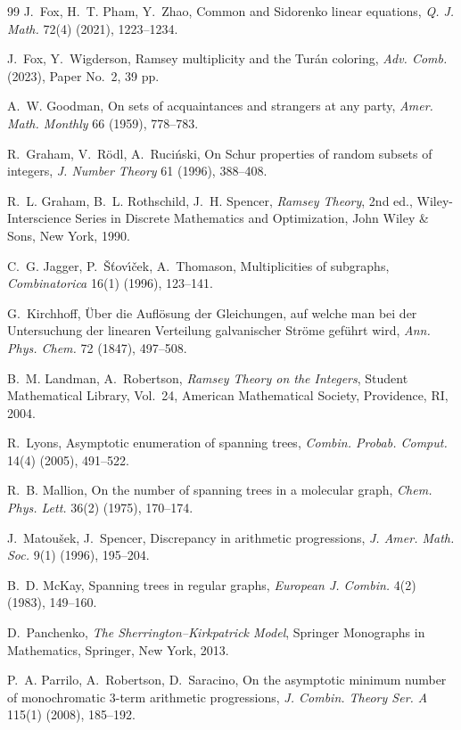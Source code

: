 \documentclass[twoside,12pt]{article}
\newcommand{\1}{\mathbf 1}
\begin{document}
\begin{thebibliography}{99}
J.~Fox, H.~T. Pham, Y.~Zhao,
Common and Sidorenko linear equations,
\emph{Q. J. Math.} 72(4) (2021), 1223--1234.

J.~Fox, Y.~Wigderson,
Ramsey multiplicity and the Tur\'an coloring,
\emph{Adv. Comb.} (2023), Paper No.~2, 39 pp.

A.~W. Goodman,
On sets of acquaintances and strangers at any party,
\emph{Amer. Math. Monthly} 66 (1959), 778--783.

R.~Graham, V.~R\"odl, A.~Ruci\'nski,
On Schur properties of random subsets of integers,
\emph{J. Number Theory} 61 (1996), 388--408.

R.~L. Graham, B.~L. Rothschild, J.~H. Spencer,
\emph{Ramsey Theory},
2nd ed.,
Wiley-Interscience Series in Discrete Mathematics and Optimization,
John Wiley \& Sons, New York, 1990.

C.~G. Jagger, P.~\v{S}\v{t}ov\'\i\v{c}ek, A.~Thomason,
Multiplicities of subgraphs,
\emph{Combinatorica} 16(1) (1996), 123--141.

G.~Kirchhoff,
\"Uber die Aufl\"osung der Gleichungen, auf welche man bei der Untersuchung
der linearen Verteilung galvanischer Str\"ome gef\"uhrt wird,
\emph{Ann. Phys. Chem.} 72 (1847), 497--508.

B.~M. Landman, A.~Robertson,
\emph{Ramsey Theory on the Integers},
Student Mathematical Library, Vol.~24,
American Mathematical Society, Providence, RI, 2004.

R.~Lyons,
Asymptotic enumeration of spanning trees,
\emph{Combin. Probab. Comput.} 14(4) (2005), 491--522.

R.~B. Mallion,
On the number of spanning trees in a molecular graph,
\emph{Chem. Phys. Lett.} 36(2) (1975), 170--174.

J.~Matou\v{s}ek, J.~Spencer,
Discrepancy in arithmetic progressions,
\emph{J. Amer. Math. Soc.} 9(1) (1996), 195--204.

B.~D. McKay,
Spanning trees in regular graphs,
\emph{European J. Combin.} 4(2) (1983), 149--160.

D.~Panchenko,
\emph{The Sherrington--Kirkpatrick Model},
Springer Monographs in Mathematics,
Springer, New York, 2013.

P.~A. Parrilo, A.~Robertson, D.~Saracino,
On the asymptotic minimum number of monochromatic \(3\)-term arithmetic progressions,
\emph{J. Combin. Theory Ser. A} 115(1) (2008), 185--192.


\end{thebibliography}
\end{document}
